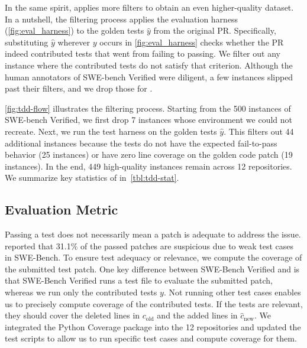In the same spirit, \tdd applies more filters to obtain an even higher-quality
dataset.  In a nutshell, the filtering process applies the \tdd evaluation
harness (\cref{fig:eval_harness}) to the golden tests $\hat{y}$ from
the original PR.  Specifically, substituting $\hat{y}$ wherever $y$ occurs in
\cref{fig:eval_harness} checks whether the PR indeed contributed tests that went
from failing to passing.  We filter out any instance where the contributed tests
do not satisfy that criterion.  Although the human annotators of SWE-bench
Verified were diligent, a few instances slipped past their filters, and we drop
those for \tdd.

\cref{fig:tdd-flow} illustrates the filtering process.  Starting from the 500 instances of SWE-bench Verified,
we first drop 7 instances whose environment we could not
recreate. Next, we run the test harness on the golden tests
$\hat{y}$. This filters out 44 additional instances because the tests
do not have the expected fail-to-pass behavior (25 instances) or have zero
line coverage on the golden code patch (19 instances).
In the end, 449 high-quality instances remain across 12 repositories. We summarize key
statistics of \tdd in~\cref{tbl:tdd-stat}.



\subsection{Evaluation Metric}
\label{subsec:eval_metric}

Passing a test does not necessarily mean a patch is adequate to address the
issue.  \citet{aleithan2024swe} reported that 31.1\% of the passed patches are
suspicious due to weak test cases in SWE-Bench.  To ensure test adequacy or
relevance, we compute the coverage of the submitted test patch.  One key
difference between SWE-Bench Verified and \tdd is that SWE-Bench Verified runs a test file to
evaluate the submitted patch, whereas we run only the contributed tests $y$.
Not running other test cases enables us to precisely compute coverage of the
contributed tests.  If the tests are relevant, they should cover the deleted
lines in $c_\mathrm{old}$ and the added lines in $\hat{c}_\mathrm{new}$.  We
integrated the Python Coverage package into the 12 repositories and updated the
test scripts to allow us to run specific test cases and compute coverage for them.

